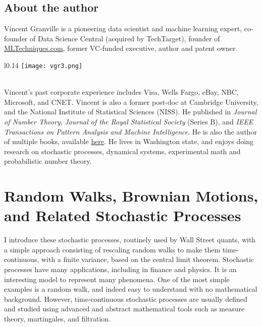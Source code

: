 \documentclass[oneside,10pt]{book}
\begin{document}
\section*{About the author}

Vincent Granville is a pioneering data scientist and machine learning expert, co-founder of Data Science Central  (acquired by TechTarget), founder of \href{https://mltechniques.com/}{MLTechniques.com}, former VC-funded executive, author and patent owner.
\begin{wrapfigure}{l}{0.14\textwidth}
\vspace{-1ex}
\texttt{[image: vgr3.png]}
\end{wrapfigure}
\vspace{-2ex}\quad \\
\noindent Vincent’s past corporate experience includes Visa, Wells Fargo, eBay, NBC, Microsoft, and CNET.
Vincent is also a former post-doc at Cambridge University, and the National Institute of Statistical Sciences (NISS).
He  published in {\em Journal of Number Theory}, {\em Journal of the Royal Statistical Society} (Series B), and {\em IEEE Transactions on Pattern Analysis and Machine Intelligence}. He is also the author of multiple books, available \href{https://mltechniques.com/resources/}{here}. He lives  in Washington state, and enjoys doing research on stochastic processes, dynamical systems, experimental math and probabilistic number theory.

\listoffigures


\hypersetup{linkcolor=red}
\renewcommand{\baselinestretch}{1.00}\normalsize
\tableofcontents
\renewcommand{\baselinestretch}{1.00}\normalsize

\chapter{Random Walks, Brownian Motions, and Related Stochastic Processes}\label{ch1}

I introduce these stochastic processes, routinely used by Wall Street quants, with a simple approach consisting of rescaling random walks to make them time-continuous, with a finite variance, based on the central limit theorem.
Stochastic processes have many applications, including in finance and physics. It is an interesting model to represent many phenomena.
One of the most simple examples is a random walk, and indeed easy to understand with no mathematical background. However, time-continuous stochastic processes are usually defined and studied using advanced and abstract mathematical tools such as measure theory, martingales, and filtration.
\end{document}
